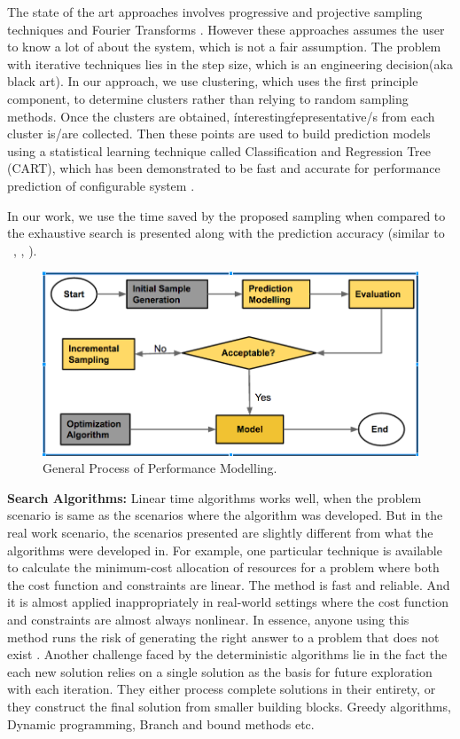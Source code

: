 \documentclass{sig-alternative}
\begin{document}
    The state of the art approaches involves progressive and projective sampling techniques \cite{sarkar2015cost} and Fourier Transforms \cite{zhang2015performance}. However these approaches assumes the user to know a lot of about the system, which is not a fair assumption. The problem with iterative techniques lies in the step size, which is an engineering decision(aka black art). In our approach, we use clustering, which uses the first principle component, to determine clusters rather than relying to random sampling methods. Once the clusters are obtained, \'interesting\' representative/s from each cluster  is/are collected. Then these points are used to build prediction models using a statistical learning technique called Classification and Regression Tree (CART), which has been demonstrated to be fast and accurate for performance prediction of configurable system \cite{guo2013variability}.
    
In our work, we use the time saved by the proposed sampling when compared to the exhaustive search is presented along with the prediction accuracy (similar to ~\cite{guo2013variability}, \cite{siegmund2012predicting}, \cite{westermann2012automated}). 
    \begin{figure}[!t]
\includegraphics[width=\linewidth]{Figures/GeneralProcess.png}
\caption{ General Process of Performance Modelling. }\label{fig:GeneralProcess}
\end{figure}


    \textbf{Search Algorithms: }Linear time algorithms works well, when the problem scenario is same as the scenarios where the algorithm was developed. But in the real work scenario, the scenarios presented are slightly different from what the algorithms were developed in. For example, one particular technique is available to calculate the minimum-cost allocation of resources for a problem where both the cost function and constraints are linear. The method is fast and reliable. And it is almost applied inappropriately  in real-world settings where the cost function and constraints are almost always nonlinear. In essence, anyone using this method runs the risk of generating the right answer to a problem that does not exist \cite{michalewicz2013solve}. 
    Another challenge faced by the deterministic algorithms lie in the fact the each new solution
relies on a single solution as the basis for future exploration with each iteration. They either process complete solutions in their entirety, or they construct the final solution from smaller building blocks. Greedy algorithms,
Dynamic programming, Branch and bound methods etc. 
\end{document}
